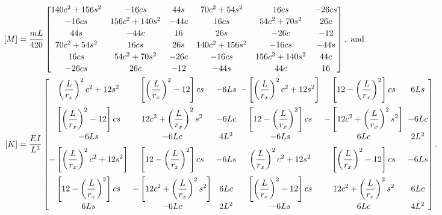 \documentclass{AeroStructure-ERJohnson}
\begin{document}
\begin{align}\label{eq18.194}
\hspace*{-4pt}[M]&=\frac{m L}{420}\left[\begin{array}{@{}cccccc@{}}140 c^{2}+156 s^{2} & -16 c s & 44 s & 70 c^{2}+54 s^{2} & 16 c s & -26 c s \\[2pt]
-16 c s & 156 c^{2}+140 s^{2} & -44 c & 16 c s & 54 c^{2}+70 s^{2} & 26 c \\[2pt]
44 s & -44 c & 16 & 26 s & -26 c & -12 \\[2pt]
70 c^{2}+54 s^{2} & 16 c s & 26 s & 140 c^{2}+156 s^{2} & -16 c s & -44 s \\[2pt]
16 c s & 54 c^{2}+70 s^{2} & -26 c & -16 c s & 156 c^{2}+140 s^{2} & 44 c \\[2pt]
-26 c s & 26 c & -12 & -44 s & 44 c & 16\end{array}\right],\ \text{and}\\
\hspace*{-5pt}{[}K]&=\frac{EI}{L^3}\left[\begin{array}{@{}c@{\hspace*{5pt}}c@{\hspace*{5pt}}c@{\hspace*{5pt}}c@{\hspace*{5pt}}c@{\hspace*{5pt}}c@{}}
\displaystyle\left(\frac{L}{r_x}\right)^2c^2+12s^2 & \displaystyle  \left[\left(\frac{L}{r_x}\right)^2-12\right]cs & \displaystyle  -6Ls & \displaystyle  -\left[\left(\frac{L}{r_x}\right)^2c^2+12s^2\right] & \displaystyle  \left[12-\left(\frac{L}{r_x}\right)^2\right]cs & \displaystyle  6Ls\\[14pt]
\displaystyle\left[\left(\frac{L}{r_x}\right)^2-12\right]cs & \displaystyle  12c^2+\left(\frac{L}{r_x}\right)^2s^2 & \displaystyle  -6Lc & \displaystyle  \left[12-\left(\frac{L}{r_x}\right)^2\right]cs & \displaystyle  -\left[12c^2+\left(\frac{L}{r_x}\right)^2s^2\right] & \displaystyle  -6Lc\\[6pt]
-6Ls & -6Lc & 4L^2 & -6Ls & 6Lc & 2L^2\\[6pt]
\displaystyle-\left[\left(\frac{L}{r_x}\right)^2c^2+12s^2\right] & \displaystyle  \left[12-\left(\frac{L}{r_x}\right)^2\right]cs & \displaystyle  -6Ls & \displaystyle  \left(\frac{L}{r_x}\right)^2c^2+12s^2 & \displaystyle  \left[\left(\frac{L}{r_x}\right)^2-12\right]cs & \displaystyle  -6Ls\\[14pt]
\displaystyle\left[12-\left(\frac{L}{r_x}\right)^2\right]cs & \displaystyle  -\left[12c^2+\left(\frac{L}{r_x}\right)^2s^2\right] & \displaystyle  6Lc & \displaystyle  \left[\left(\frac{L}{r_x}\right)^2-12\right]cs & \displaystyle  12c^2+\left(\frac{L}{r_x}\right)^2s^2 & \displaystyle  6Lc\\[6pt]
6Ls & -6Lc & 2L^2 & -6Ls & 6Lc & 4L^2
\end{array}\right].
\label{eq18.195}
\end{align}
\end{document}
